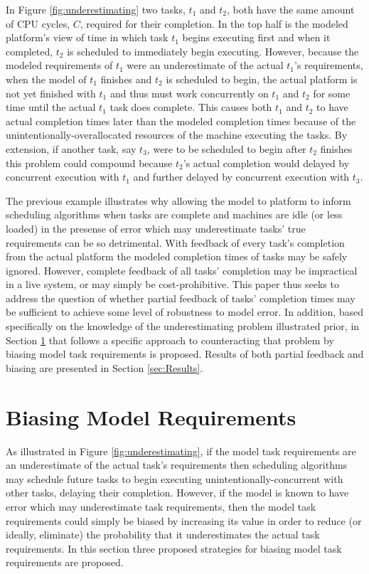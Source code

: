 \documentclass[10pt]{csce}
\begin{document}
In Figure \ref{fig:underestimating} two tasks, $t_1$ and $t_2$, both have
the same amount of CPU cycles, $C$, required for their completion.  In the
top half is the modeled platform's view of time in which task $t_1$ begins
executing first and when it completed, $t_2$ is scheduled to immediately
begin executing.  However, because the modeled requirements of $t_1$ were
an underestimate of the actual $t_1$'s requirements, when the model of
$t_1$ finishes and $t_2$ is scheduled to begin, the actual platform is not
yet finished with $t_1$ and thus must work concurrently on $t_1$ and $t_2$
for some time until the actual $t_1$ task does complete.  This causes both
$t_1$ and $t_2$ to have actual completion times later than the modeled
completion times because of the unintentionally-overallocated resources of
the machine executing the tasks.  By extension, if another task, say $t_3$,
were to be scheduled to begin after $t_2$ finishes this problem could compound
because $t_2$'s actual completion would delayed by concurrent execution with
$t_1$ and further delayed by concurrent execution with $t_3$.

The previous example illustrates why allowing the model to platform to
inform scheduling algorithms when tasks are complete and machines are
idle (or less loaded) in the presense of error which may underestimate tasks'
true requirements can be so detrimental.  With feedback of every task's
completion from the actual platform the modeled completion times of tasks
may be safely ignored.  However, complete feedback of all tasks' completion
may be impractical in a live system, or may simply be cost-prohibitive.
This paper thus seeks to address the question of whether partial feedback
of tasks' completion times may be sufficient to achieve some level of
robustness to model error.  In addition, based specifically on the
knowledge of the underestimating problem illustrated prior, in Section
\ref{sec:Biasing} that follows a specific approach to counteracting
that problem by biasing model task requirements is proposed.  Results of
both partial feedback and biasing are presented in Section \ref{sec:Results}.


\section{Biasing Model Requirements}
\label{sec:Biasing}

As illustrated in Figure \ref{fig:underestimating}, if the model task
requirements are an underestimate of the actual task's requirements then
scheduling algorithms may schedule future tasks to begin executing
unintentionally-concurrent with other tasks, delaying their completion.
However, if the model is known to have error which may underestimate
task requirements, then the model task requirements could simply be
biased by increasing its value in order to reduce (or ideally, eliminate)
the probability that it underestimates the actual task requirements.
In this section three proposed strategies for biasing model task
requirements are proposed.
\end{document}
